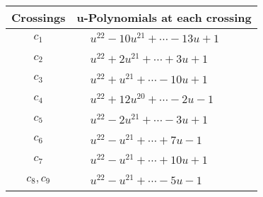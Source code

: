 \documentclass[1p]{elsarticle_modified}
\theoremstyle{definition}
\begin{document}
\begin{tabular}{m{50pt}|m{274pt}}
Crossings & \hspace{64pt}u-Polynomials at each crossing \\
\hline $$\begin{aligned}c_{1}\end{aligned}$$&$\begin{aligned}
&u^{22}-10 u^{21}+\cdots-13 u+1
\end{aligned}$\\
\hline $$\begin{aligned}c_{2}\end{aligned}$$&$\begin{aligned}
&u^{22}+2 u^{21}+\cdots+3 u+1
\end{aligned}$\\
\hline $$\begin{aligned}c_{3}\end{aligned}$$&$\begin{aligned}
&u^{22}+u^{21}+\cdots-10 u+1
\end{aligned}$\\
\hline $$\begin{aligned}c_{4}\end{aligned}$$&$\begin{aligned}
&u^{22}+12 u^{20}+\cdots-2 u-1
\end{aligned}$\\
\hline $$\begin{aligned}c_{5}\end{aligned}$$&$\begin{aligned}
&u^{22}-2 u^{21}+\cdots-3 u+1
\end{aligned}$\\
\hline $$\begin{aligned}c_{6}\end{aligned}$$&$\begin{aligned}
&u^{22}- u^{21}+\cdots+7 u-1
\end{aligned}$\\
\hline $$\begin{aligned}c_{7}\end{aligned}$$&$\begin{aligned}
&u^{22}- u^{21}+\cdots+10 u+1
\end{aligned}$\\
\hline $$\begin{aligned}c_{8},c_{9}\end{aligned}$$&$\begin{aligned}
&u^{22}- u^{21}+\cdots-5 u-1
\end{aligned}$\\

\end{tabular}
\end{document}
